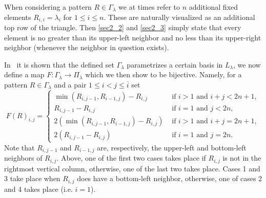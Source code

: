\documentclass[10pt,a4paper]{article}
\theoremstyle{remark}\newtheorem{rema}[theo]{Remark}
\newcommand{\la}{\lambda}
\begin{document}
When considering a pattern $R\in\Gamma_\la$ we at times refer to $n$ additional fixed elements $R_{i,i}=\la_i$ for $1\le i\le n$. These are naturally visualized as an additional top row of the triangle. Then \eqref{sec2_2}  and \eqref{sec2_3} simply state that every element is no greater than its upper-left neighbor and no less than its upper-right neighbor (whenever the neighbor in question exists).

In~\cite{Mo} it is shown that the defined set $\Gamma_\la$ parametrizes a certain basis in $L_\la$, we now define a map $F:\Gamma_\la\to\Pi_\la$ which we then show to be bijective. Namely, for a pattern $R\in\Gamma_\la$ and a pair $1\le i<j\le\overline i$ set
\[
F(R)_{i,j}=
\begin{cases}
\min(R_{i,j-1},R_{i-1,j})-R_{i,j}&\text{ if }i>1\text{ and }i+j<2n+1,\\
R_{i,j-1}-R_{i,j}&\text{ if }i=1\text{ and }j<2n,\\
2(\min(R_{i,j-1},R_{i-1,j})-R_{i,j})&\text{ if }i>1\text{ and }i+j=2n+1,\\
2(R_{i,j-1}-R_{i,j})&\text{ if }i=1\text{ and }j=2n.
\end{cases}
\]
Note that $R_{i,j-1}$ and $R_{i-1,j}$ are, respectively, the upper-left and bottom-left neighbors of $R_{i,j}$. Above, one of the first two cases takes place if $R_{i,j}$ is not in the rightmost vertical column, otherwise, one of the last two takes place. Cases 1 and 3 take place when $R_{i,j}$ does have a bottom-left neighbor, otherwise, one of cases 2 and 4 takes place (i.e. $i=1$).
\end{document}
